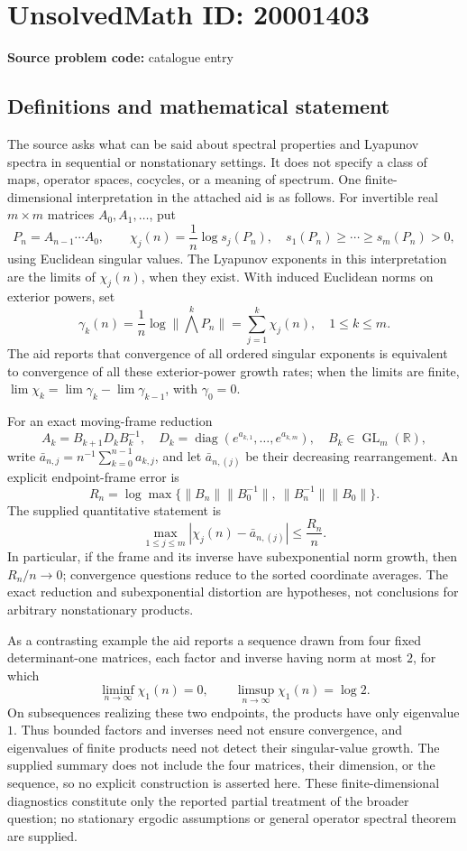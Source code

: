 \documentclass[11pt]{article}
\newcommand{\R}{\mathbb{R}}
\begin{document}
\section*{UnsolvedMath ID: 20001403}
\textbf{Source problem code:} catalogue entry
\subsection{Definitions and mathematical statement}
The source asks what can be said about spectral properties and Lyapunov spectra in sequential or nonstationary settings. It does not specify a class of maps, operator spaces, cocycles, or a meaning of spectrum. One finite-dimensional interpretation in the attached aid is as follows. For invertible real \(m\times m\) matrices \(A_0,A_1,\ldots\), put
\[
 P_n=A_{n-1}\cdots A_0,\qquad
 \chi_j(n)=\frac1n\log s_j(P_n),\quad
 s_1(P_n)\ge\cdots\ge s_m(P_n)>0,
\]
using Euclidean singular values. The Lyapunov exponents in this interpretation are the limits of \(\chi_j(n)\), when they exist. With induced Euclidean norms on exterior powers, set
\[
 \gamma_k(n)=\frac1n\log\|\bigwedge^kP_n\|
             =\sum_{j=1}^k\chi_j(n),\quad 1\le k\le m.
\]
The aid reports that convergence of all ordered singular exponents is equivalent to convergence of all these exterior-power growth rates; when the limits are finite, \(\lim\chi_k=\lim\gamma_k-\lim\gamma_{k-1}\), with \(\gamma_0=0\).

For an exact moving-frame reduction
\[
 A_k=B_{k+1}D_kB_k^{-1},\quad
 D_k=\operatorname{diag}(e^{a_{k,1}},\ldots,e^{a_{k,m}}),\quad B_k\in\operatorname{GL}_m(\R),
\]
write \(\bar a_{n,j}=n^{-1}\sum_{k=0}^{n-1}a_{k,j}\), and let \(\bar a_{n,(j)}\) be their decreasing rearrangement. An explicit endpoint-frame error is
\[
 R_n=\log\max\{\|B_n\|\|B_0^{-1}\|,\ \|B_n^{-1}\|\|B_0\|\}.
\]
The supplied quantitative statement is
\[
 \max_{1\le j\le m}|\chi_j(n)-\bar a_{n,(j)}|\le\frac{R_n}{n}.
\]
In particular, if the frame and its inverse have subexponential norm growth, then \(R_n/n\to0\); convergence questions reduce to the sorted coordinate averages. The exact reduction and subexponential distortion are hypotheses, not conclusions for arbitrary nonstationary products.

As a contrasting example the aid reports a sequence drawn from four fixed determinant-one matrices, each factor and inverse having norm at most \(2\), for which
\[
 \liminf_{n\to\infty}\chi_1(n)=0,\qquad
 \limsup_{n\to\infty}\chi_1(n)=\log2.
\]
On subsequences realizing these two endpoints, the products have only eigenvalue \(1\). Thus bounded factors and inverses need not ensure convergence, and eigenvalues of finite products need not detect their singular-value growth. The supplied summary does not include the four matrices, their dimension, or the sequence, so no explicit construction is asserted here. These finite-dimensional diagnostics constitute only the reported partial treatment of the broader question; no stationary ergodic assumptions or general operator spectral theorem are supplied.
\end{document}
